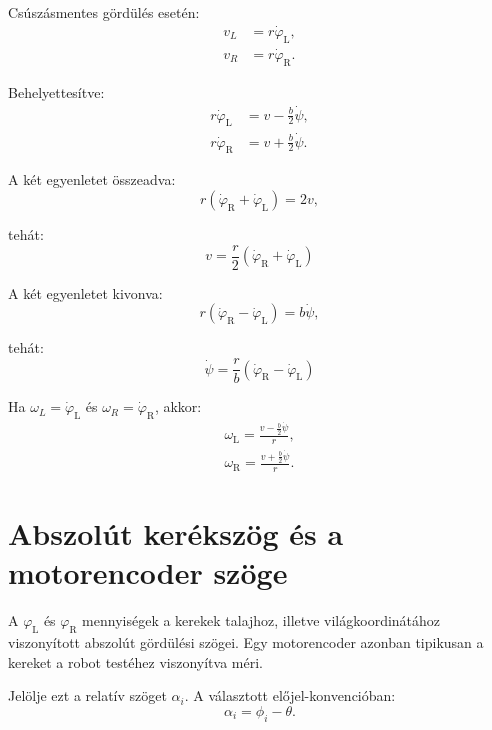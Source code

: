 \documentclass[12pt,a4paper]{article}
\newcommand{\phiL}{\varphi_{\mathrm{L}}}
\newcommand{\phiR}{\varphi_{\mathrm{R}}}
\newcommand{\omegaL}{\omega_{\mathrm{L}}}
\newcommand{\omegaR}{\omega_{\mathrm{R}}}
\begin{document}
	Csúszásmentes gördülés esetén:
	\begin{align}
		v_L &= r\dot\phiL,\\
		v_R &= r\dot\phiR.
	\end{align}
	
	Behelyettesítve:
	\begin{align}
		r\dot\phiL &= v-\frac{b}{2}\dot\psi,\\
		r\dot\phiR &= v+\frac{b}{2}\dot\psi.
	\end{align}
	
	A két egyenletet összeadva:
	\begin{equation}
		r(\dot\phiR+\dot\phiL)=2v,
	\end{equation}
	
	tehát:
	\begin{equation}
		\boxed{
			v=\frac{r}{2}(\dot\phiR+\dot\phiL)
		}
	\end{equation}
	
	A két egyenletet kivonva:
	\begin{equation}
		r(\dot\phiR-\dot\phiL)=b\dot\psi,
	\end{equation}
	
	tehát:
	\begin{equation}
		\boxed{
			\dot\psi=\frac{r}{b}(\dot\phiR-\dot\phiL)
		}
	\end{equation}
	
	Ha $\omega_L=\dot\phiL$ és $\omega_R=\dot\phiR$, akkor:
	\begin{align}
		\boxed{\omegaL=\frac{v-\frac{b}{2}\dot\psi}{r}},\\
		\boxed{\omegaR=\frac{v+\frac{b}{2}\dot\psi}{r}}.
	\end{align}
	
	\section{Abszolút kerékszög és a motorencoder szöge}
	
	A $\phiL$ és $\phiR$ mennyiségek a kerekek talajhoz, illetve világkoordinátához viszonyított abszolút gördülési szögei. Egy motorencoder azonban tipikusan a kereket a robot testéhez viszonyítva méri.
	
	Jelölje ezt a relatív szöget $\alpha_i$. A választott előjel-konvencióban:
	\begin{equation}
		\alpha_i=\phi_i-\theta.
	\end{equation}
	
\end{document}
